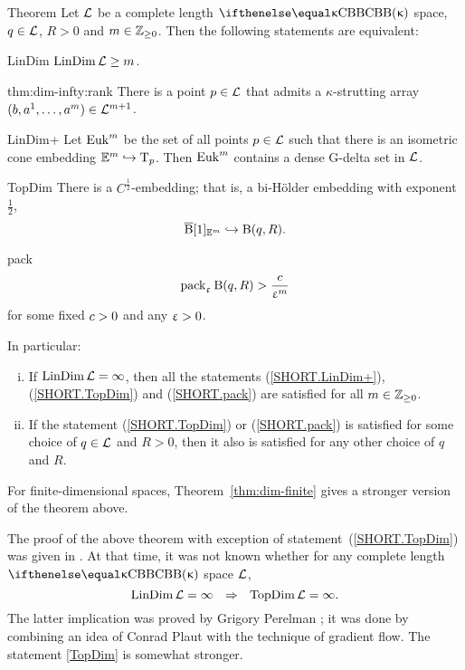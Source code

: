 \begin{thm}{Theorem}\label{thm:dim-infty}
Let $\mathcal{L}$ be a complete length $\Alex{\kappa}$ space, 
$q\in \spc{L}$, 
$R>0$ 
and $m\in \ZZ_{\ge0}$.
Then the following statements are equivalent:
\begin{subthmA}{LinDim}  $\LinDim\spc{L}\ge m$.
\end{subthmA}

\begin{subthmA}{thm:dim-infty:rank}
There is a point $p\in\spc{L}$ that admits a $\kappa$-strutting array $(b,a^1,\dots,a^m)\in\spc{L}^{m+1}$.
\end{subthmA}

\begin{subthmA}{LinDim+} Let $\mathop{\rm Euk}\nolimits^m$ be the set 
of all points $p\in \spc{L}$ such that there is an isometric cone embedding $\EE^m\hookrightarrow \T_p$.
Then $\mathop{\rm Euk}\nolimits^m$  contains a dense G-delta set in $\mathcal{L}$.
\end{subthmA}

\begin{subthmA}{TopDim} There is a $C^{\frac{1}{2}}$-embedding; that is, a bi-H\"older embedding with exponent $\tfrac{1}{2}$,
\[\cBall[1]_{\EE^m}\hookrightarrow \oBall(q,R).\]
\end{subthmA}

\begin{subthmA}{pack} 
\[\mathop{\rm pack}\nolimits_\upvarepsilon \mathrm{B}{}(q,R)>\frac{c}{\upvarepsilon^m}\]
for some fixed $c>0$ and any $\upvarepsilon>0$.
\end{subthmA}

\medskip

In particular:
\begin{enumerate}[(i)]
\item If $\mathop{\rm LinDim}\nolimits\mathcal{L}=\infty$, then all the statements (\ref{SHORT.LinDim+}), (\ref{SHORT.TopDim}) and (\ref{SHORT.pack}) are satisfied for all $m\in\ZZ_{\ge0}$. 
\item 
 If the statement (\ref{SHORT.TopDim}) or (\ref{SHORT.pack}) is satisfied for some choice of $q\in \spc{L}$ and $R>0$, then it also is satisfied for any other choice of $q$ and $R$.
\end{enumerate}
\end{thm}

For finite-dimensional spaces, Theorem~\ref{thm:dim-finite} gives a stronger version 
of the theorem above.

The proof of the above theorem with exception of  statement~(\ref{SHORT.TopDim}) was given in \cite{plaut:dimension}.
At that time, it was not known whether for any complete length $\Alex\kappa$ space $\mathcal{L}$,
\[\LinDim\spc{L}=\infty\ \ \Rightarrow\ \ \TopDim\spc{L}=\infty.\]
The latter implication was proved by Grigory Perelman \cite{perelman-petrunin:qg};
it was done by combining an idea of Conrad Plaut with the technique of gradient flow.
The statement \ref{TopDim} is somewhat stronger.


